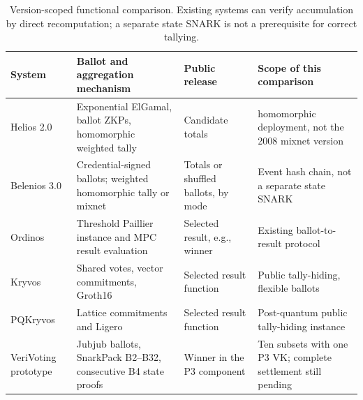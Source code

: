 \begin{table}[t]
\caption{Version-scoped functional comparison. Existing systems can verify accumulation by direct recomputation; a separate state SNARK is not a prerequisite for correct tallying.}
\label{tab:stage1-functions}
\centering\small
\begin{tabularx}{\textwidth}{@{}>{\raggedright\arraybackslash}p{}*{3}{>{\raggedright\arraybackslash}X}@{}}
\toprule
System & Ballot and aggregation mechanism & Public release & Scope of this comparison \\
\midrule
Helios 2.0~\cite{cmpHelios2009} & Exponential ElGamal, ballot ZKPs, homomorphic weighted tally & Candidate totals & 2009 homomorphic deployment, not the 2008 mixnet version \\
Belenios 3.0~\cite{cmpBelenios3} & Credential-signed ballots; weighted homomorphic tally or mixnet & Totals or shuffled ballots, by mode & Event hash chain, not a separate state SNARK \\
Ordinos~\cite{cmpOrdinos2020} & Threshold Paillier instance and MPC result evaluation & Selected result, e.g., winner & Existing ballot-to-result protocol \\
Kryvos~\cite{cmpKryvos2022} & Shared votes, vector commitments, Groth16 & Selected result function & Public tally-hiding, flexible ballots \\
PQKryvos~\cite{cmpPQKryvos2026} & Lattice commitments and Ligero & Selected result function & Post-quantum public tally-hiding instance \\
VeriVoting prototype & Jubjub ballots, SnarkPack B2--B32, consecutive B4 state proofs & Winner in the P3 component & Ten subsets with one P3 VK; complete settlement still pending \\
\bottomrule
\end{tabularx}
\end{table}

